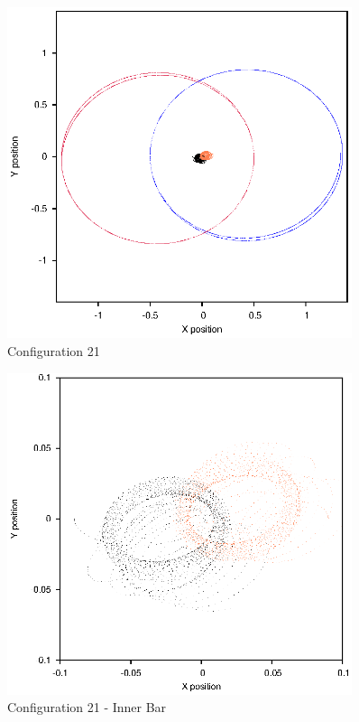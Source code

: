 \documentclass[a4paper,12pt]{article}
\begin{document}
\begin{figure}[H]
\centering
\includegraphics[width=0.9\textwidth]{./2017results/09-95-09-1/Orbit.eps}
\caption{Configuration 21}
\label{fig:config21}
\end{figure}
\begin{figure}[H]
\centering
\includegraphics[width=0.9\textwidth]{./2017results/09-95-09-1/Inner.eps}
\caption{Configuration 21 - Inner Bar}
\label{fig:config21i}
\end{figure}
\end{document}
